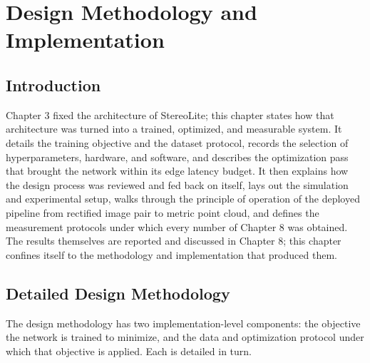 \chapter{Design Methodology and Implementation}

\section{Introduction}
Chapter 3 fixed the architecture of StereoLite; this chapter states how
that architecture was turned into a trained, optimized, and measurable
system. It details the training objective and the dataset protocol,
records the selection of hyperparameters, hardware, and software, and
describes the optimization pass that brought the network within its edge
latency budget. It then explains how the design process was reviewed and
fed back on itself, lays out the simulation and experimental setup, walks
through the principle of operation of the deployed pipeline from
rectified image pair to metric point cloud, and defines the measurement
protocols under which every number of Chapter 8 was obtained. The results
themselves are reported and discussed in Chapter 8; this chapter confines
itself to the methodology and implementation that produced them.

\FloatBarrier
\section{Detailed Design Methodology}
The design methodology has two implementation-level components: the
objective the network is trained to minimize, and the data and
optimization protocol under which that objective is applied. Each is
detailed in turn.

